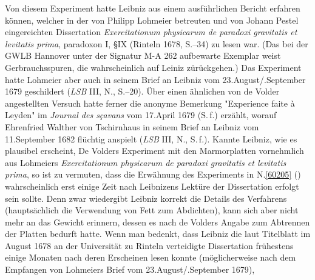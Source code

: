 Von diesem Experiment hatte Leibniz aus einem ausführlichen Bericht erfahren können, welcher in der von Philipp Lohmeier betreuten und von Johann Pestel eingereichten Dissertation \textit{Exercitationum physicarum de paradoxi gravitatis et levitatis prima}, paradoxon I, §\;IX (Rinteln 1678, S.--34)\cite{01429} zu lesen war.
(Das bei der GWLB Hannover unter der Signatur M-A 262 aufbewarte Exemplar weist Gerbrauchsspuren, die wahrscheinlich auf Leiniz zürückgehen.)
Das Experiment hatte Lohmeier aber auch in seinem Brief an Leibniz vom 23.\:August\;/.\:September 1679 geschildert (\textit{LSB} III, N., S.--20).\cite{01425}
Über einen ähnlichen von de Volder angestellten Versuch hatte ferner die anonyme Bemerkung "Experience faite à Leyden" im \textit{Journal des sçavans} vom 17.\;April 1679 (S.\,f.)\cite{02524} erzählt,
worauf Ehrenfried Walther von Tschirnhaus in seinem Brief an Leibniz vom 11.\;September 1682 flüchtig anspielt (\textit{LSB} III, N., S.\,f.).\cite{02525}
Kannte Leibniz, wie es plausibel erscheint, De Volders Experiment mit den Marmorplatten vornehmlich aus Lohmeiers \textit{Exercitationum physicarum de paradoxi gravitatis et levitatis prima},\cite{01429} so ist zu vermuten, dass die Erwähnung des Experiments in N.\;\ref{60205} () wahrscheinlich erst einige Zeit nach Leibnizens Lektüre der Dissertation\cite{01429} erfolgt sein sollte.
Denn zwar wiedergibt Leibniz korrekt die Details des Verfahrens (hauptsächlich die Verwendung von Fett zum Abdichten), kann sich aber nicht mehr an das Gewicht erinnern, dessen es nach de Volders Angabe zum Abtrennen der Platten bedurft hatte.
Wenn man bedenkt, dass Leibniz die laut Titelblatt im August 1678 an der Universität zu Rinteln verteidigte Dissertation frühestens einige Monaten nach deren Erscheinen lesen konnte (möglicherweise nach dem Empfangen von Lohmeiers Brief\cite{01425} vom 23.\:August\;/.\:September 1679), 
